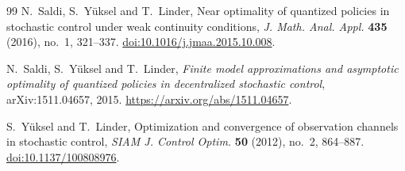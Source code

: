\begin{thebibliography}{99}
N.~Saldi, S.~Y\"uksel and T.~Linder, Near optimality of quantized policies
in stochastic control under weak continuity conditions,
\emph{J. Math. Anal. Appl.} \textbf{435} (2016), no.~1, 321--337.
\href{https://doi.org/10.1016/j.jmaa.2015.10.008}{doi:10.1016/j.jmaa.2015.10.008}.

N.~Saldi, S.~Y\"uksel and T.~Linder, \emph{Finite model approximations
and asymptotic optimality of quantized policies in decentralized
stochastic control}, arXiv:1511.04657, 2015.
\url{https://arxiv.org/abs/1511.04657}.

S.~Y\"uksel and T.~Linder, Optimization and convergence of observation
channels in stochastic control, \emph{SIAM J. Control Optim.}
\textbf{50} (2012), no.~2, 864--887.
\href{https://doi.org/10.1137/100808976}{doi:10.1137/100808976}.
\end{thebibliography}
